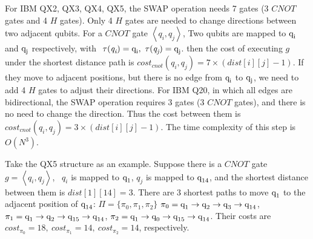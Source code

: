 \documentclass[runningheads]{llncs}
\begin{document}
For IBM QX2, QX3, QX4, QX5, the SWAP operation needs 7 gates (3 $CNOT$ gates and 4 $H$ gates). Only 4 $H$ gates are needed to change directions between two adjacent qubits. For a $CNOT$ gate $\left \langle  \textit{q}_\textit{i},\textit{q}_\textit{j} \right \rangle $,
Two qubits are mapped to $\textup{q}_{\textup{i}}$ and $\textup{q}_{\textup{j}}$ respectively, with $\ \tau(\textit{q}_\textit{i})=\textup{q}_{\textup{i}},\ \tau(\textit{q}_\textit{j})=\textup{q}_{\textup{j}}$. then the cost of executing $g$ under the shortest distance path is $cost_{cnot}(\textit{q}_\textit{i},\textit{q}_\textit{j})=7 \times( dist[i][j]-1)$. If they move to adjacent positions, but there is no edge from $\textup{q}_{\textup{i}}$ to $\textup{q}_{\textup{j}}$, we need to add 4 $H$ gates to adjust their directions. For IBM Q20, in which all edges are bidirectional, the SWAP operation requires 3 gates (3 $CNOT$ gates), 
and there is no need to change the direction. Thus the cost between them is $cost_{cnot}(\textit{q}_\textit{i},\textit{q}_\textit{j})=3 \times( dist[i][j]-1)$. The time complexity of this step is $O (N^{3})$.
\begin{example}
	Take the QX5 structure as an example. Suppose there is a $CNOT$ gate $g=\left \langle  \textit{q}_\textit{i}, \textit{q}_\textit{j} \right \rangle $, \ $\textit{q}_\textit{i}$ is mapped to $\textup{q}_{1}$,  $\textit{q}_\textit{j}$ is mapped to $\textup{q}_{\textup{14}}$, and the shortest distance between them  is $dist[1][14]=3$. There are 3 shortest paths to move $\textup{q}_{\textup{1}}$ to the adjacent position of 
$\textup{q}_{\textup{14}}$:
$\Pi=\{\pi_{0},\pi_{1},\pi_{2}\}$
$\pi_{0}={\textup{q}_{\textup{1}}\rightarrow \textup{q}_{\textup{2}} \rightarrow \textup{q}_{\textup{3}} \rightarrow \textup{q}_{\textup{14}}}$,
$\pi_{1}={\textup{q}_{\textup{1}}\rightarrow \textup{q}_{\textup{2}} \rightarrow \textup{q}_{\textup{15}} \rightarrow \textup{q}_{\textup{14}}}$,
$\pi_{2}={\textup{q}_{\textup{1}}\rightarrow \textup{q}_{\textup{0}} \rightarrow \textup{q}_{\textup{15}} \rightarrow \textup{q}_{\textup{14}}}$.
Their costs are 
$cost_{\pi_{0}}=18,\ cost_{\pi_{1}}=14,\ cost_{\pi_{2}}=14$, respectively.
\end{example}
\end{document}
